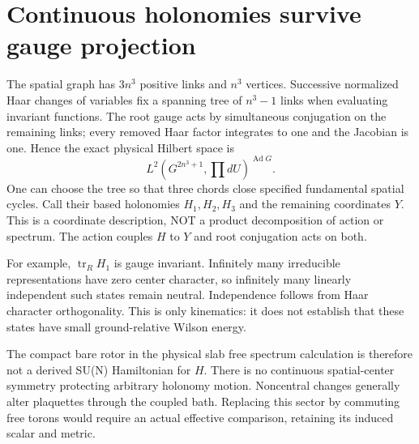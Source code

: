 \documentclass{article}
\begin{document}
\section*{Continuous holonomies survive gauge projection}
The spatial graph has $3n^3$ positive links and $n^3$ vertices. Successive normalized Haar changes of variables fix a spanning tree of $n^3-1$ links when evaluating invariant functions. The root gauge acts by simultaneous conjugation on the remaining links; every removed Haar factor integrates to one and the Jacobian is one. Hence the exact physical Hilbert space is
\[
 L^2(G^{2n^3+1},\prod dU)^{\operatorname{Ad}G}.
\]
One can choose the tree so that three chords close specified fundamental spatial cycles. Call their based holonomies $H_1,H_2,H_3$ and the remaining coordinates $Y$. This is a coordinate description, NOT a product decomposition of action or spectrum. The action couples $H$ to $Y$ and root conjugation acts on both.

For example, $\operatorname{tr}_R H_1$ is gauge invariant. Infinitely many irreducible representations have zero center character, so infinitely many linearly independent such states remain neutral. Independence follows from Haar character orthogonality. This is only kinematics: it does not establish that these states have small ground-relative Wilson energy.

The compact bare rotor in the physical slab free spectrum calculation is therefore not a derived SU(N) Hamiltonian for $H$. There is no continuous spatial-center symmetry protecting arbitrary holonomy motion. Noncentral changes generally alter plaquettes through the coupled bath. Replacing this sector by commuting free torons would require an actual effective comparison, retaining its induced scalar and metric.
\end{document}
